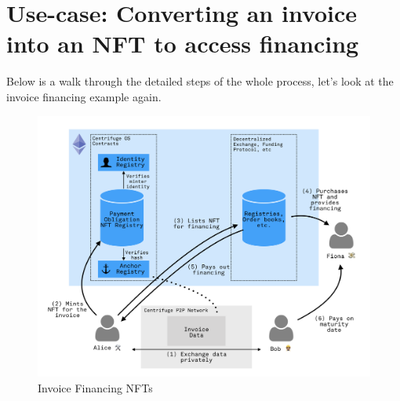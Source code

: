 \documentclass[a4paper, 10pt]{article}
\begin{document}
\section{Use-case: Converting an invoice into an NFT to access financing}
Below is a walk through the detailed steps of the whole process, let’s look at the invoice financing example again.

\begin{figure}[thpb]
  \centering
  \includegraphics[width=15cm]{drawings/funding_marketplace.png}
  \caption{Invoice Financing NFTs} 
  \label{funding_marketplace}
\end{figure}
\end{document}
